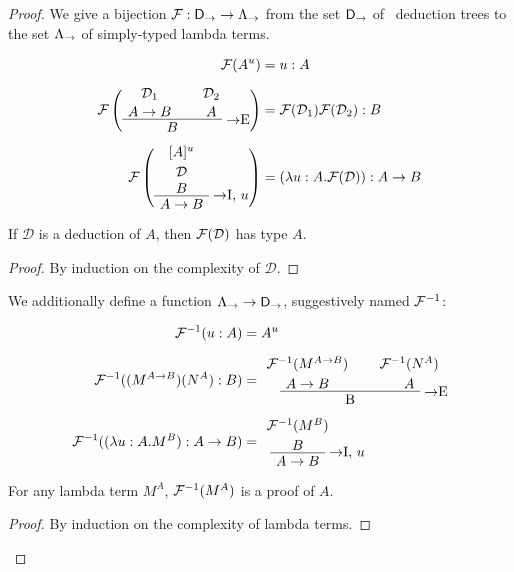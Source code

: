 \begin{proof}
We give a bijection $\mathcal{F}: \mathsf{D}_\to \to \Lambda_\to$ from the set $\mathsf{D}_\to$
of \implnpi\ deduction trees to the set $\Lambda_\to$ of simply-typed lambda terms.

\begin{alignat*}{2}
\chmap(A^u) &= u: A \\[6pt]
\chmap\left(
  \AxiomC{$\mathcal{D}_1$}
  \noLine
  \UnaryInfC{$A \to B$}
  \AxiomC{$\mathcal{D}_2$}
  \noLine
  \UnaryInfC{$A$}
  \RightLabel{$\to$E}
  \BinaryInfC{$B$}
  \DisplayProof
\right) &= \chmap(\mathcal{D}_1) \chmap(\mathcal{D}_2): B \\[6pt]
\chmap\left(
  \AxiomC{$[A]^u$}
  \noLine
  \UnaryInfC{$\mathcal{D}$}
  \noLine
  \UnaryInfC{$B$}
  \RightLabel{$\to$I, $u$}
  \UnaryInfC{$A \to B$}
  \DisplayProof
\right) &= (\lambda u: A.\chmap(\mathcal{D})): A \to B
\end{alignat*}

\begin{proposition}
If $\mathcal{D}$ is a deduction of $A$, then $\mathcal{F}(\mathcal{D})$ has type $A$.
\end{proposition}

\begin{proof}
By induction on the complexity of $\mathcal{D}$.
\end{proof}

We additionally define a function $\Lambda_\to \to \mathsf{D}_\to$, suggestively
named $\mathcal{F}^{-1}$:

\begin{alignat*}{2}
\chmapanta(u: A) &= A^u \\[6pt]
\chmapanta((M^{A \to B})(N^A): B) &=
  \AxiomC{$\chmapanta(M^{A \to B})$}
  \noLine
  \UnaryInfC{$A \to B$}
  \AxiomC{$\chmapanta(N^A)$}
  \noLine
  \UnaryInfC{$A$}
  \RightLabel{$\to$E}
  \BinaryInfC{B}
  \DisplayProof \\[6pt]
\chmapanta((\lambda u:A.M^B):A \to B) &=
  \AxiomC{$\chmapanta(M^B)$}
  \noLine
  \UnaryInfC{$B$}
  \RightLabel{$\to$I, $u$}
  \UnaryInfC{$A \to B$}
  \DisplayProof
\end{alignat*}

\begin{proposition}
For any lambda term $M^A$, $\mathcal{F}^{-1}(M^A)$ is a proof of $A$.
\end{proposition}

\begin{proof}
By induction on the complexity of lambda terms.
\end{proof}


\end{proof}
